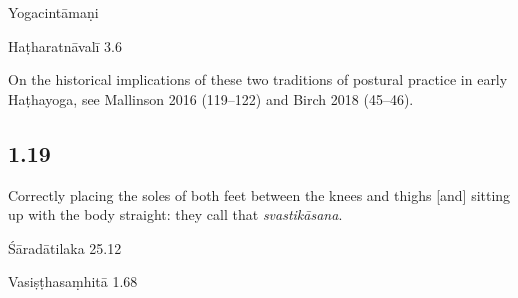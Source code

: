 \begin{ekdosis}
\begin{testimonia}[hp01_018]
Yogacintāmaṇi

\begin{versinnote}
\end{versinnote}

Haṭharatnāvalī 3.6

\begin{versinnote}
\end{versinnote}

\end{testimonia}

\begin{philcomm}[hp01_018]        
On the historical implications of these two traditions of postural practice in early Haṭhayoga, see Mallinson 2016 (119–122) and Birch 2018 (45–46).
\end{philcomm}

\subsection*{1.19}
\begin{translation}[hp01_019]
Correctly placing the soles of both feet between the knees and thighs [and] sitting up with the body straight: they call that \emph{svastikāsana}.
\end{translation}

\begin{sources}[hp01_019]
Śāradātilaka 25.12

\begin{versinnote}
\end{versinnote}

Vasiṣṭhasaṃhitā 1.68

\begin{versinnote}
\end{versinnote}


\end{sources}
\end{ekdosis}

